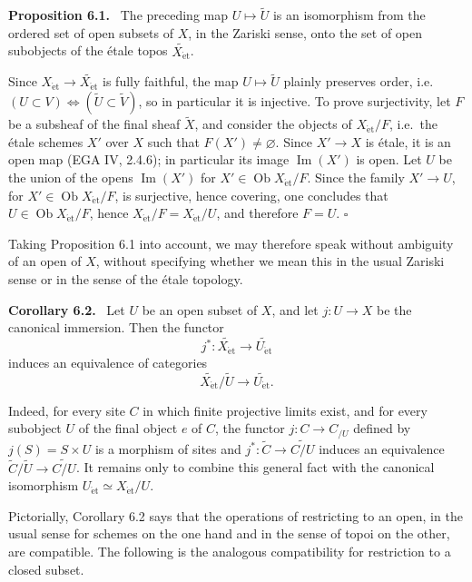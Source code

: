 \documentclass[11pt]{article}
\newcommand{\Ob}{\operatorname{Ob}}
\newcommand{\et}{\mathrm{\acute{e}t}}
\newcommand{\ie}{i.e.\ }
\newcommand{\EGA}{EGA}
\newcommand{\qedtext}{\hfill\(\square\)}
\newenvironment{statement}[1]{\par\medskip\noindent\textbf{#1.}\ }{\par\medskip}
\begin{document}
\begin{statement}{Proposition 6.1}
The preceding map \(U\mapsto \widetilde U\) is an isomorphism from the ordered set of open subsets of \(X\), in the Zariski sense, onto the set of open subobjects of the \'etale topos \(\widetilde{X_{\et}}\).
\end{statement}

Since \(X_{\et}\to\widetilde{X_{\et}}\) is fully faithful, the map \(U\mapsto\widetilde U\) plainly preserves order, \ie \((U\subset V)\Leftrightarrow(\widetilde U\subset\widetilde V)\), so in particular it is injective. To prove surjectivity, let \(F\) be a subsheaf of the final sheaf \(\widetilde X\), and consider the objects of \(X_{\et}/F\), \ie the \'etale schemes \(X'\) over \(X\) such that \(F(X')\ne\varnothing\). Since \(X'\to X\) is \'etale, it is an open map (\EGA{} IV, 2.4.6); in particular its image \(\operatorname{Im}(X')\) is open. Let \(U\) be the union of the opens \(\operatorname{Im}(X')\) for \(X'\in\Ob X_{\et}/F\). Since the family \(X'\to U\), for \(X'\in\Ob X_{\et}/F\), is surjective, hence covering, one concludes that \(U\in\Ob X_{\et}/F\), hence \(X_{\et}/F=X_{\et}/U\), and therefore \(F=U\). \qedtext

Taking Proposition 6.1 into account, we may therefore speak without ambiguity of an open of \(X\), without specifying whether we mean this in the usual Zariski sense or in the sense of the \'etale topology.

\begin{statement}{Corollary 6.2}
Let \(U\) be an open subset of \(X\), and let \(j:U\to X\) be the canonical immersion. Then the functor
\[
j^*:\widetilde{X_{\et}}\longrightarrow \widetilde{U_{\et}}
\]
induces an equivalence of categories
\[
\widetilde{X_{\et}}/\widetilde U\longrightarrow \widetilde{U_{\et}}.
\]
\end{statement}

Indeed, for every site \(C\) in which finite projective limits exist, and for every subobject \(U\) of the final object \(e\) of \(C\), the functor \(j:C\to C_{/U}\) defined by \(j(S)=S\times U\) is a morphism of sites and \(j^*: \widetilde C\to\widetilde{C/U}\) induces an equivalence \(\widetilde C/\widetilde U\to\widetilde{C/U}\). It remains only to combine this general fact with the canonical isomorphism \(U_{\et}\simeq X_{\et}/U\).

Pictorially, Corollary 6.2 says that the operations of restricting to an open, in the usual sense for schemes on the one hand and in the sense of topoi on the other, are compatible. The following is the analogous compatibility for restriction to a closed subset.
\end{document}
